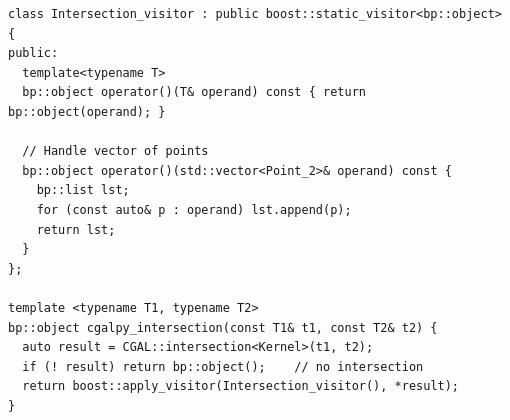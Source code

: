 \begin{lstfloat}
  \begin{lstlisting}[style=cppFramedStyle,basicstyle=\normalsize,%
                     label={lst:intersectionImpl},%
                     caption={Implementation of the binding for \cppLstinline{CGAL::intersection()}.}]
class Intersection_visitor : public boost::static_visitor<bp::object> {
public:
  template<typename T>
  bp::object operator()(T& operand) const { return bp::object(operand); }

  // Handle vector of points
  bp::object operator()(std::vector<Point_2>& operand) const {
    bp::list lst;
    for (const auto& p : operand) lst.append(p);
    return lst;
  }
};

template <typename T1, typename T2>
bp::object cgalpy_intersection(const T1& t1, const T2& t2) {
  auto result = CGAL::intersection<Kernel>(t1, t2);
  if (! result) return bp::object();    // no intersection
  return boost::apply_visitor(Intersection_visitor(), *result);
}
  \end{lstlisting}
\end{lstfloat}

